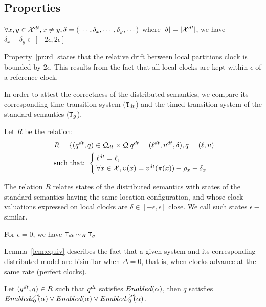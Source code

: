 \subsection{Properties}

\begin{property}\label{pr:rd}
  $\forall x,y\in\mathcal{X}^{dt},x\neq y,\delta=(\cdots,\delta_x,\cdots,\delta_y,\cdots)$
  where $|\delta|=|\mathcal{X}^{dt}|$, we have $\delta_x-\delta_y\in[-2\epsilon,2\epsilon]$
\end{property}

Property~\ref{pr:rd} states that the relative drift between local partitions 
clock is bounded by $2\epsilon$. This results from the fact that all local
clocks are kept within $\epsilon$ of a reference clock.

In order to attest the correctness of the distributed semantics, we compare
its corresponding time transition system ($\texttt{T}_{dt}$) and the timed transition system 
of the standard semantics ($\texttt{T}_{g}$).

Let $R$ be the relation:
\begin{align*}
  R=\{(q^{dt},q)\in\mathcal{Q}_{dt}\times\mathcal{Q}|q^{dt}=(\ell^{dt},\upsilon^{dt},\delta), q=(\ell,\upsilon) \\
  \text{ such that: }  
  \begin{cases}
  \ell^{dt}=\ell,\\
  \forall x\in\mathcal{X},\upsilon(x)=v^{dt}(\pi(x))-\rho_x-\delta_x  
\end{cases}
\end{align*}

The relation $R$ relates states of the distributed semantics with
states of the standard semantics having the same location configuration,
and whose clock valuations expressed on local clocks are $\delta\in[-\epsilon,\epsilon]$ close. 
We call such states $\epsilon-$similar.

\begin{lemma}\label{lem:equiv}
  For $\epsilon=0$, we have $\texttt{T}_{dt}\sim_{R}\texttt{T}_{g}$ 
\end{lemma}

Lemma~\ref{lem:equiv} describes the fact that a given system and its corresponding 
distributed model are bisimilar when $\Delta=0$, that is, when clocks advance at the same 
rate (perfect clocks). 

\begin{property}\label{pr:enabled1}
  Let $(q^{dt},q)\in R$ such that $q^{dt}$ satisfies $Enabled(\alpha)$, then
  $q$ satisfies \\$\enabledbackwardb{\alpha}{0}{\epsilon}\vee\enabled{\alpha}
  \vee\enabledforwardb{\alpha}{0}{\epsilon}$.
\end{property}

